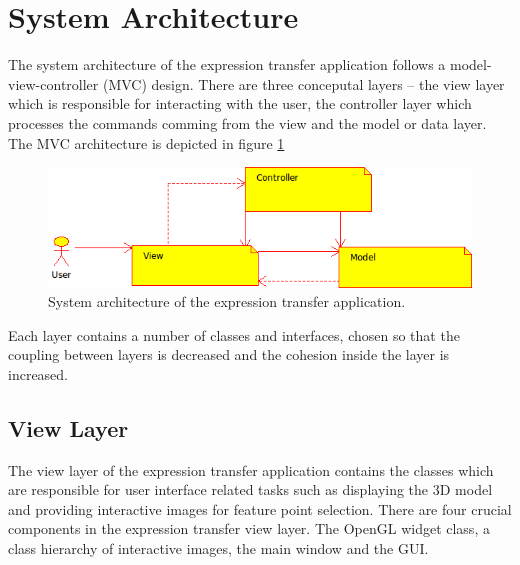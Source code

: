 \documentclass[11pt,a4paper]{report}
\begin{document}
\section{System Architecture}
The system architecture of the expression transfer application follows a
model-view-controller (MVC) design. There are three conceputal layers -- the
view layer which is responsible for interacting with the user, the controller
layer which processes the commands comming from the view and the model or data
layer. The MVC architecture is depicted in figure \ref{fg:mvc} 

\begin{figure}[H]
\begin{centering}
\includegraphics[scale=0.75]{images/mvc.png}
\par\end{centering}

\caption{System architecture of the expression transfer application.}
\label{fg:mvc}
\end{figure}

Each layer contains a number of classes and interfaces, chosen so that the coupling
between layers is decreased and the cohesion inside the layer is increased. 

\subsection{View Layer}
The view layer of the expression transfer application contains the classes which
are responsible for user interface related tasks such as displaying the 3D model
and providing interactive images for feature point selection. There are four
crucial components in the expression transfer view layer. The
OpenGL widget class, a class hierarchy of interactive images, the main
window and the GUI.
\end{document}
